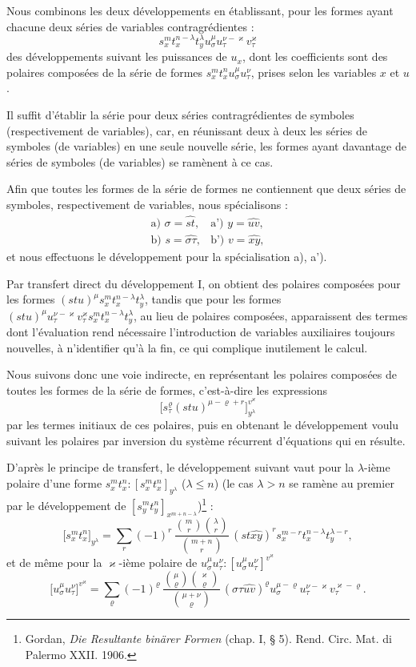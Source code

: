 \documentclass[11pt]{article}
\begin{document}
Nous combinons les deux développements en établissant, pour les formes ayant chacune deux séries de variables contragrédientes :
\[
s_x^m t_x^{n-\lambda}t_y^\lambda u_\sigma^\mu u_\tau^{\nu-\varkappa}v_\tau^\varkappa
\]
des développements suivant les puissances de $u_x$, dont les coefficients sont des polaires composées de la série de formes $s_x^m t_x^n u_\sigma^\mu u_\tau^\nu$, prises selon les variables $x$ et $u$.

Il suffit d'établir la série pour deux séries contragrédientes de symboles (respectivement de variables), car, en réunissant deux à deux les séries de symboles (de variables) en une seule nouvelle série, les formes ayant davantage de séries de symboles (de variables) se ramènent à ce cas.

Afin que toutes les formes de la série de formes ne contiennent que deux séries de symboles, respectivement de variables, nous spécialisons :
\[
\begin{array}{ll}
\text{a) } \sigma=\widehat{st}, & \text{a') } y=\widehat{uv},\\[0.3em]
\text{b) } s=\widehat{\sigma\tau}, & \text{b') } v=\widehat{xy},
\end{array}
\]
et nous effectuons le développement pour la spécialisation a), a').

Par transfert direct du développement I, on obtient des polaires composées pour les formes $(stu)^\mu s_x^m t_x^{n-\lambda}t_y^\lambda$, tandis que pour les formes $(stu)^\mu u_\tau^{\nu-\varkappa}v_\tau^\varkappa s_x^m t_x^{n-\lambda}t_y^\lambda$, au lieu de polaires composées, apparaissent des termes dont l'évaluation rend nécessaire l'introduction de variables auxiliaires toujours nouvelles, à n'identifier qu'à la fin, ce qui complique inutilement le calcul.

Nous suivons donc une voie indirecte, en représentant les polaires composées de toutes les formes de la série de formes, c'est-à-dire les expressions
\[
\bigl[s_\tau^\varrho(stu)^{\mu-\varrho+r}\bigr]_{y^\lambda}^{v^\varkappa}
\]
par les termes initiaux de ces polaires, puis en obtenant le développement voulu suivant les polaires par inversion du système récurrent d'équations qui en résulte.

D'après le principe de transfert, le développement suivant vaut pour la $\lambda$-ième polaire d'une forme $s_x^m t_x^n:[s_x^m t_x^n]_{y^\lambda}$ ($\lambda\le n$) (le cas $\lambda>n$ se ramène au premier par le développement de $[s_y^m t_y^n]_{x^{m+n-\lambda}}$)\footnote{Gordan, \emph{Die Resultante binärer Formen} (chap. I, \S{} 5). Rend. Circ. Mat. di Palermo XXII. 1906.} :
\[
\bigl[s_x^m t_x^n\bigr]_{y^\lambda}
=\sum_r (-1)^r\,
\frac{\binom{m}{r}\binom{\lambda}{r}}{\binom{m+n}{r}}\,
(st\widehat{xy})^r s_x^{m-r}t_x^{n-\lambda}t_y^{\lambda-r},
\]
et de même pour la $\varkappa$-ième polaire de $u_\sigma^\mu u_\tau^\nu:[u_\sigma^\mu u_\tau^\nu]^{v^\varkappa}$
\[
\bigl[u_\sigma^\mu u_\tau^\nu\bigr]^{v^\varkappa}
=\sum_\varrho (-1)^\varrho\,
\frac{\binom{\mu}{\varrho}\binom{\varkappa}{\varrho}}{\binom{\mu+\nu}{\varrho}}\,
(\sigma\tau\widehat{uv})^\varrho u_\sigma^{\mu-\varrho}u_\tau^{\nu-\varkappa}v_\tau^{\varkappa-\varrho}.
\]
\end{document}
